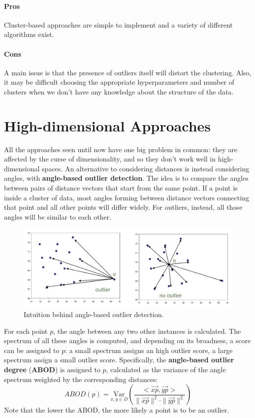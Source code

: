 \paragraph{Pros} Cluster-based approaches are simple to implement and a variety of different algorithms exist.

\paragraph{Cons} A main issue is that the presence of outliers itself will distort the clustering. Also, it may be difficult choosing the appropriate hyperparameters and number of clusters when we don't have any knowledge about the structure of the data.

\section{High-dimensional Approaches}

All the approaches seen until now have one big problem in common: they are affected by the curse of dimensionality, and so they don't work well in high-dimensional spaces. An alternative to considering distances is instead considering angles, with \textbf{angle-based outlier detection}. The idea is to compare the angles between pairs of distance vectors that start from the same point. If a point is inside a cluster of data, most angles forming between distance vectors connecting that point and all other points will differ widely. For outliers, instead, all those angles will be similar to each other.
\begin{figure}[ht]
    \centering
    \includegraphics[width=0.7\linewidth]{img/angle_based_od.png}
    \caption{Intuition behind angle-based outlier detection.}
    \label{fig:angle-based}
\end{figure}
For each point $p$, the angle between any two other instances is calculated. The spectrum of all these angles is computed, and depending on its broadness, a score can be assigned to $p$: a small spectrum assigns an high outlier score, a large spectrum assign a small outlier score. Specifically, the \textbf{angle-based outlier degree} (\textbf{ABOD}) is assigned to $p$, calculated as the variance of the angle spectrum weighted by the corresponding distances:
\begin{equation*}
    \textit{ABOD}(p) = \underset{x,y \in D}{\mathrm{Var}} \left ( \dfrac{< \vec{xp}, \vec{yp} >}{\|\vec{xp}\|^2 \cdot \|\vec{yp}\|^2}  \right )
\end{equation*}
Note that the lower the ABOD, the more likely a point is to be an outlier.


